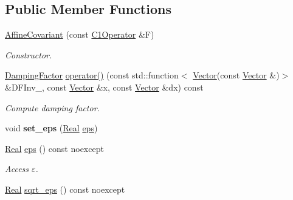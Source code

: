 \subsection*{\-Public \-Member \-Functions}
\begin{DoxyCompactItemize}
\item 
\hypertarget{classSpacy_1_1Newton_1_1Damping_1_1AffineCovariant_abf3615a91c70a145759d74eff761ec51}{\hyperlink{classSpacy_1_1Newton_1_1Damping_1_1AffineCovariant_abf3615a91c70a145759d74eff761ec51}{\-Affine\-Covariant} (const \hyperlink{classSpacy_1_1C1Operator}{\-C1\-Operator} \&\-F)}\label{classSpacy_1_1Newton_1_1Damping_1_1AffineCovariant_abf3615a91c70a145759d74eff761ec51}

\begin{DoxyCompactList}\small\item\em \-Constructor. \end{DoxyCompactList}\item 
\hypertarget{classSpacy_1_1Newton_1_1Damping_1_1AffineCovariant_a451040d8a986f1ae912b34713ced26ec}{\hyperlink{classSpacy_1_1DampingFactor}{\-Damping\-Factor} \hyperlink{classSpacy_1_1Newton_1_1Damping_1_1AffineCovariant_a451040d8a986f1ae912b34713ced26ec}{operator()} (const std\-::function$<$ \hyperlink{classSpacy_1_1Vector}{\-Vector}(const \hyperlink{classSpacy_1_1Vector}{\-Vector} \&)$>$ \&\-D\-F\-Inv\-\_\-, const \hyperlink{classSpacy_1_1Vector}{\-Vector} \&x, const \hyperlink{classSpacy_1_1Vector}{\-Vector} \&dx) const }\label{classSpacy_1_1Newton_1_1Damping_1_1AffineCovariant_a451040d8a986f1ae912b34713ced26ec}

\begin{DoxyCompactList}\small\item\em \-Compute damping factor. \end{DoxyCompactList}\item 
\hypertarget{classSpacy_1_1Mixin_1_1Eps_a818ab6dfab5e4eea583e1302bcc621f8}{void {\bfseries set\-\_\-eps} (\hyperlink{classSpacy_1_1Real}{\-Real} \hyperlink{classSpacy_1_1Mixin_1_1Eps_a812b99b0abc1d78a34b4114907f23f52}{eps})}\label{classSpacy_1_1Mixin_1_1Eps_a818ab6dfab5e4eea583e1302bcc621f8}

\item 
\hypertarget{classSpacy_1_1Mixin_1_1Eps_a812b99b0abc1d78a34b4114907f23f52}{\hyperlink{classSpacy_1_1Real}{\-Real} \hyperlink{classSpacy_1_1Mixin_1_1Eps_a812b99b0abc1d78a34b4114907f23f52}{eps} () const noexcept}\label{classSpacy_1_1Mixin_1_1Eps_a812b99b0abc1d78a34b4114907f23f52}

\begin{DoxyCompactList}\small\item\em \-Access $\varepsilon$. \end{DoxyCompactList}\item 
\hypertarget{classSpacy_1_1Mixin_1_1Eps_a1c1b0ed7f14ed4967dc7da9295a136d4}{\hyperlink{classSpacy_1_1Real}{\-Real} \hyperlink{classSpacy_1_1Mixin_1_1Eps_a1c1b0ed7f14ed4967dc7da9295a136d4}{sqrt\-\_\-eps} () const noexcept}\label{classSpacy_1_1Mixin_1_1Eps_a1c1b0ed7f14ed4967dc7da9295a136d4}


\end{DoxyCompactItemize}
